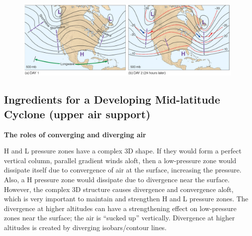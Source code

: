 \documentclass[12pt,oneside]{book}
\begin{document}
\begin{figure}

{\centering \includegraphics[width=0.8\linewidth]{figures/Figure632b} 

}

\caption{ }\label{fig:Fig632b}
\end{figure}

\subsection{Ingredients for a Developing Mid-latitude Cyclone (upper air
support)}\label{ingredients-for-a-developing-mid-latitude-cyclone-upper-air-support}

\textbf{The roles of converging and diverging air}

H and L pressure zones have a complex 3D shape. If they would form a
perfect vertical column, parallel gradient winds aloft, then a
low-pressure zone would dissipate itself due to convergence of air at
the surface, increasing the pressure. Also, a H pressure zone would
dissipate due to divergence near the surface. However, the complex 3D
structure causes divergence and convergence aloft, which is very
important to maintain and strengthen H and L pressure zones. The
divergence at higher altitudes can have a strengthening effect on
low-pressure zones near the surface; the air is ``sucked up''
vertically. Divergence at higher altitudes is created by diverging
isobars/contour lines.
\end{document}
